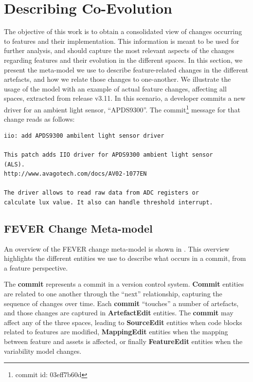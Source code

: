 
\section{Describing Co-Evolution}
\label{sec:approach}

The objective of this work is to obtain a consolidated view of changes occurring to features and their implementation.
This information is meant to be used for further analysis, and should capture the most relevant aspects of the changes regarding 
features and their evolution in the different spaces.
In this section, we present the meta-model we use to describe feature-related changes in the different artefacts,
and how we relate those changes to one-another.
We illustrate the usage of the model with an example of actual feature changes, affecting all spaces, extracted from release v3.11.
In this scenario, a developer commits a new driver for an ambient light sensor, ``APDS9300''.
The commit\footnote{commit id: 03eff7b60d} message for that change reads as follows:
\begin{verbatim}
iio: add APDS9300 ambilent light sensor driver
    
This patch adds IIO driver for APDS9300 ambient light sensor 
(ALS).
http://www.avagotech.com/docs/AV02-1077EN
    
The driver allows to read raw data from ADC registers or 
calculate lux value. It also can handle threshold interrupt.
\end{verbatim}

\subsection{FEVER Change Meta-model}

An overview of the FEVER change meta-model is shown in .
This overview highlights the different entities we use to describe what occurs in a commit, from a feature perspective.

The \textbf{commit} represents a commit in a version control system.
\textbf{Commit} entities are related to one another through the ``next'' relationship, 
capturing the sequence of changes over time.
Each \textbf{commit} ``touches'' a number of artefacts, and those changes are captured in \textbf{ArtefactEdit} entities.
The \textbf{commit} may affect any of the three spaces, leading to \textbf{SourceEdit} entities when code blocks related to features are modified,
\textbf{MappingEdit} entities when the mapping between feature and assets is affected, or finally
\textbf{FeatureEdit} entities when the variability model changes.

